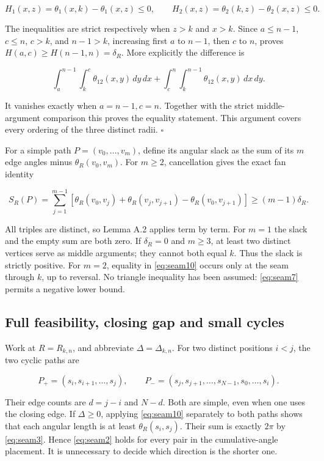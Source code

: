 \[
 H_1(x,z)=\theta_1(x,k)-\theta_1(x,z)\le0,\qquad
 H_2(x,z)=\theta_2(k,z)-\theta_2(x,z)\le0.
\]

The inequalities are strict respectively when $z>k$ and $x>k$.
Since $a\le n-1$, $c\le n$, $c>k$, and $n-1>k$,
increasing first $a$ to $n-1$, then $c$ to $n$, proves
$H(a,c)\ge H(n-1,n)=\delta_R$. More explicitly the difference is

\[
 \int_a^{n-1}\int_k^c\theta_{12}(x,y)\,dy\,dx
 +\int_c^n\int_k^{n-1}\theta_{12}(x,y)\,dx\,dy.
 \tag{A.9}\label{eq:seam9}
\]

It vanishes exactly when $a=n-1,c=n$. Together with the strict
middle-argument comparison this proves the equality statement. This argument
covers every ordering of the three distinct radii. \hfill$\square$

For a simple path $P=(v_0,\ldots,v_m)$, define its angular slack as
the sum of its $m$ edge angles minus $\theta_R(v_0,v_m)$.
For $m\ge2$, cancellation gives the exact fan identity

\[
 S_R(P)=\sum_{j=1}^{m-1}
 [\theta_R(v_0,v_j)+\theta_R(v_j,v_{j+1})-\theta_R(v_0,v_{j+1})]
 \ge(m-1)\delta_R. \tag{A.10}\label{eq:seam10}
\]

All triples are distinct, so Lemma A.2 applies term by term. For $m=1$
the slack and the empty sum are both zero. If $\delta_R=0$ and
$m\ge3$, at least two distinct vertices serve as middle arguments;
they cannot both equal $k$. Thus the slack is strictly positive.
For $m=2$, equality in \eqref{eq:seam10} occurs only at the seam through $k$,
up to reversal. No triangle inequality has been assumed: \eqref{eq:seam7} permits a
negative lower bound.

\subsection{Full feasibility, closing gap and small cycles}

Work at $R=R_{k,n}$, and abbreviate $\Delta=\Delta_{k,n}$.
For two distinct positions $i<j$, the two cyclic paths are

\[
 P_+=(s_i,s_{i+1},\ldots,s_j),\qquad
 P_-=(s_j,s_{j+1},\ldots,s_{N-1},s_0,\ldots,s_i).
\]

Their edge counts are $d=j-i$ and $N-d$. Both are simple, even
when one uses the closing edge. If $\Delta\ge0$, applying \eqref{eq:seam10}
separately to both paths shows that each angular length is at least
$\theta_R(s_i,s_j)$. Their sum is exactly $2\pi$ by \eqref{eq:seam3}.
Hence \eqref{eq:seam2} holds for every pair in the cumulative-angle placement. It is
unnecessary to decide which direction is the shorter one.

